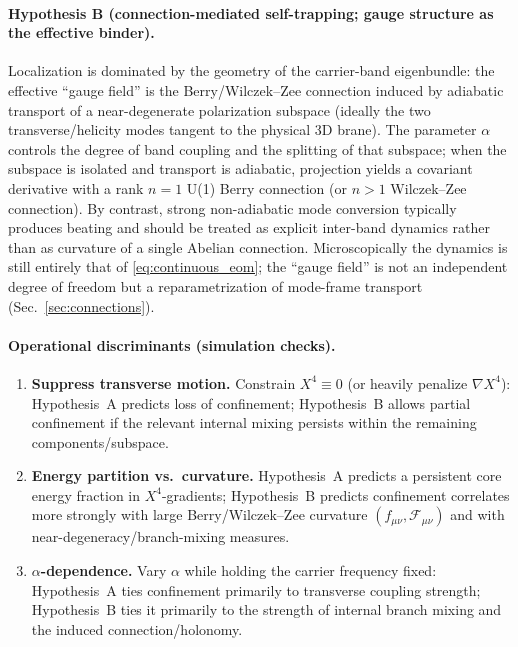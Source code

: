 \documentclass[11pt,a4paper]{article}
\newcommand{\bbF}{\mathcal{F}}              %
\begin{document}
\paragraph{Hypothesis B (connection-mediated self-trapping; gauge structure as the effective binder).}
Localization is dominated by the geometry of the carrier-band eigenbundle: the effective ``gauge field'' is the
Berry/Wilczek--Zee connection induced by adiabatic transport of a near-degenerate polarization subspace
(ideally the two transverse/helicity modes tangent to the physical 3D brane).
The parameter \(\alpha\) controls the degree of band coupling and the splitting of that subspace; when the subspace
is isolated and transport is adiabatic, projection yields a covariant derivative with a rank \(n=1\) U(1) Berry connection
(or \(n>1\) Wilczek--Zee connection). By contrast, strong non-adiabatic mode conversion typically produces beating
and should be treated as explicit inter-band dynamics rather than as curvature of a single Abelian connection.
Microscopically the dynamics is still entirely that of \eqref{eq:continuous_eom}; the ``gauge field'' is not an
independent degree of freedom but a reparametrization of mode-frame transport (Sec.~\ref{sec:connections}).

\paragraph{Operational discriminants (simulation checks).}
\begin{enumerate}
  \item \textbf{Suppress transverse motion.} Constrain \(X^4\equiv 0\) (or heavily penalize \(\nabla X^4\)):
        Hypothesis~A predicts loss of confinement; Hypothesis~B allows partial confinement if the relevant
        internal mixing persists within the remaining components/subspace.
  \item \textbf{Energy partition vs.\ curvature.} Hypothesis~A predicts a persistent core energy fraction in
        \(X^4\)-gradients; Hypothesis~B predicts confinement correlates more strongly with large Berry/Wilczek--Zee
        curvature \((f_{\mu\nu},\bbF_{\mu\nu})\) and with near-degeneracy/branch-mixing measures.
  \item \textbf{\(\alpha\)-dependence.} Vary \(\alpha\) while holding the carrier frequency fixed:
        Hypothesis~A ties confinement primarily to transverse coupling strength; Hypothesis~B ties it primarily to
        the strength of internal branch mixing and the induced connection/holonomy.
\end{enumerate}
\end{document}
